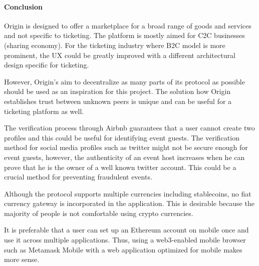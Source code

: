 \paragraph{Conclusion}
Origin is designed to offer a marketplace for a broad range of goods and services and not specific to ticketing. The platform is mostly aimed for C2C businesses (sharing economy). For the ticketing industry where B2C model is more prominent, the UX could be greatly improved with a different architectural design specific for ticketing.

However, Origin's aim to decentralize as many parts of its protocol as possible should be used as an inspiration for this project. The solution how Origin establishes trust between unknown peers is unique and can be useful for a ticketing platform as well. 

The verification process through Airbnb guarantees that a user cannot create two profiles and this could be useful for identifying event guests. The verification method for social media profiles such as twitter might not be secure enough for event guests, however, the authenticity of an event host increases when he can prove that he is the owner of a well known twitter account. 
This could be a crucial method for preventing fraudulent events.

Although the protocol supports multiple currencies including stablecoins, no fiat currency gateway is incorporated in the application. This is desirable because the majority of people is not comfortable using crypto currencies.

It is preferable that a user can set up an Ethereum account on mobile once and use it across multiple applications. Thus, using a web3-enabled mobile browser such as Metamask Mobile with a web application optimized for mobile makes more sense.

